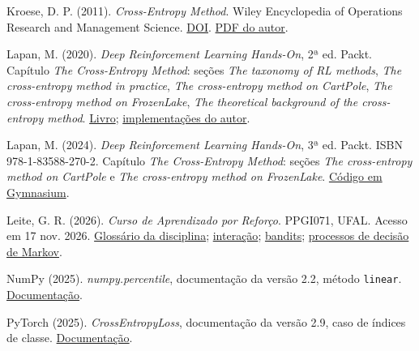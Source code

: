 \documentclass[12pt]{article}
\begin{document}
\noindent Kroese, D. P. (2011). \emph{Cross-Entropy Method}. Wiley Encyclopedia of Operations Research and Management Science. \href{https://doi.org/10.1002/9780470400531.eorms0210}{DOI}. \href{https://people.smp.uq.edu.au/DirkKroese/ps/eormsCE.pdf}{PDF do autor}.\par\smallskip

\noindent Lapan, M. (2020). \emph{Deep Reinforcement Learning Hands-On}, 2ª ed. Packt. Capítulo \emph{The Cross-Entropy Method}: seções \emph{The taxonomy of RL methods}, \emph{The cross-entropy method in practice}, \emph{The cross-entropy method on CartPole}, \emph{The cross-entropy method on FrozenLake}, \emph{The theoretical background of the cross-entropy method}. \href{https://www.packtpub.com/en-us/product/deep-reinforcement-learning-hands-on-9781838826994}{Livro}; \href{https://github.com/PacktPublishing/Deep-Reinforcement-Learning-Hands-On-Second-Edition/tree/master/Chapter04}{implementações do autor}.\par\smallskip

\noindent Lapan, M. (2024). \emph{Deep Reinforcement Learning Hands-On}, 3ª ed. Packt. ISBN 978-1-83588-270-2. Capítulo \emph{The Cross-Entropy Method}: seções \emph{The cross-entropy method on CartPole} e \emph{The cross-entropy method on FrozenLake}. \href{https://github.com/PacktPublishing/Deep-Reinforcement-Learning-Hands-On-Third-Edition/tree/main/Chapter04}{Código em Gymnasium}.\par\smallskip

\noindent Leite, G. R. (2026). \emph{Curso de Aprendizado por Reforço}. PPGI071, UFAL. Acesso em 17 nov. 2026. \href{https://github.com/glauberrleite/curso-aprendizado-por-reforco}{Glossário da disciplina}; \href{https://github.com/glauberrleite/curso-aprendizado-por-reforco/tree/main/01-introducao}{interação}; \href{https://github.com/glauberrleite/curso-aprendizado-por-reforco/tree/main/02-multi-armed-bandit}{bandits}; \href{https://github.com/glauberrleite/curso-aprendizado-por-reforco/tree/main/03-markov-decision-processes}{processos de decisão de Markov}.\par\smallskip

\noindent NumPy (2025). \emph{numpy.percentile}, documentação da versão 2.2, método \texttt{linear}. \href{https://numpy.org/doc/2.2/reference/generated/numpy.percentile.html}{Documentação}.\par\smallskip

\noindent PyTorch (2025). \emph{CrossEntropyLoss}, documentação da versão 2.9, caso de índices de classe. \href{https://docs.pytorch.org/docs/2.9/generated/torch.nn.CrossEntropyLoss.html}{Documentação}.\par\smallskip
\end{document}
